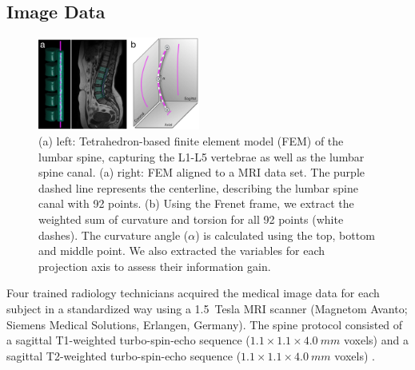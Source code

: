 \documentclass[a4paper,twoside]{style/article}
\begin{document}
\subsection{Image Data}
\begin{figure}[!h]
  \centering
  \includegraphics[width=0.475\textwidth]{figures/centerline}
  \caption{
	(a) left: Tetrahedron-based finite element model (FEM) of the lumbar spine, capturing the L1-L5 vertebrae as well as the lumbar spine canal.
	(a) right: FEM aligned to a MRI data set.
	The purple dashed line represents the centerline, describing the lumbar spine canal with 92 points.
	(b) Using the Frenet frame, we extract the weighted sum of curvature and torsion for all 92 points (white dashes).
	The curvature angle ($\alpha$) is calculated using the top, bottom and middle point.
	We also extracted the variables for each projection axis to assess their information gain.
	}
  \label{fig:centerline}
\end{figure}
Four trained radiology technicians acquired the medical image data for each subject in a standardized way using a 1.5~Tesla MRI scanner (Magnetom Avanto; Siemens Medical Solutions, Erlangen, Germany).
The spine protocol consisted of a sagittal T1-weighted turbo-spin-echo sequence ($1.1\times1.1\times4.0~mm$ voxels) and a sagittal T2-weighted turbo-spin-echo sequence ($1.1\times1.1\times4.0~mm$ voxels) \cite{Hegenscheid2013}.
\end{document}
